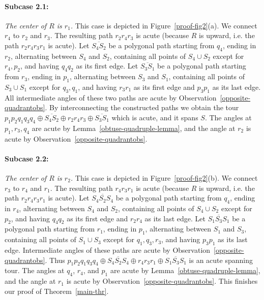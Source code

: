 \documentclass[11pt,letter]{article}
\begin{document}
\paragraph{Subcase 2.1:} {\em The center of $R$ is $r_1$.} This case is depicted in Figure~\ref{proof-fig2}(a). We connect $r_4$ to $r_2$ and $r_3$. The resulting path $r_2r_4r_3$ is acute (because $R$ is upward, i.e. the path $r_2r_4r_3r_1$ is acute). 
Let $\overline{S_4S_2}$ be a polygonal path starting from $q_4$, ending in $r_2$, alternating between $S_4$ and $S_2$, containing all points of $S_4\cup S_2$ except for $r_4,p_2$, and having $q_4q_2$ as its first edge. Let $\overline{S_3S_1}$ be a polygonal path starting from $r_3$, ending in $p_1$, alternating between $S_3$ and $S_1$, containing all points of $S_3\cup S_1$ except for $q_3,q_1$, and having $r_3r_1$ as its first edge and $p_3p_1$ as its last edge. All intermediate angles of these two paths are acute by Observation~\ref{opposite-quadrantobs}. By interconnecting the constructed paths we obtain the tour  $p_1p_2q_1q_3q_4\oplus\overline{S_4S_2}\oplus r_2r_4r_3\oplus\overline{S_3S_1}$ which is acute, and it spans $S$. The angles at $p_1,r_3,q_4$ are acute by Lemma~\ref{obtuse-quadruple-lemma}, and the angle at $r_2$ is acute by Observation~\ref{opposite-quadrantobs}.


\paragraph{Subcase 2.2:} {\em The center of $R$ is $r_2$.} This case is depicted in Figure~\ref{proof-fig2}(b). We connect $r_3$ to $r_4$ and $r_1$. The resulting path $r_4r_3r_1$ is acute (because $R$ is upward, i.e. the path $r_2r_4r_3r_1$ is acute).  
Let $\overline{S_4S_2S_4}$ be a polygonal path starting from $q_4$, ending in $r_4$, alternating between $S_4$ and $S_2$, containing all points of $S_4\cup S_2$ except for $p_2$, and having $q_4q_2$ as its first edge and $r_2r_4$ as its last edge.
Let $\overline{S_1S_3S_1}$ be a polygonal path starting from $r_1$, ending in $p_1$, alternating between $S_1$ and $S_3$, containing all points of $S_1\cup S_3$ except for $q_1,q_3,r_3$, and having $p_3p_1$ as its last edge. Intermediate angles of these paths are acute by Observation~\ref{opposite-quadrantobs}.
Thus  $p_1p_2q_1q_3q_4\oplus\overline{S_4S_2S_4}\oplus r_4r_3r_1\oplus\overline{S_1S_3S_1}$ is an acute spanning tour.
The angles at $q_4$, $r_4$, and $p_1$ are acute by Lemma~\ref{obtuse-quadruple-lemma}, and the angle at $r_1$ is acute by Observation~\ref{opposite-quadrantobs}.
This finishes our proof of Theorem~\ref{main-thr}.
\end{document}

